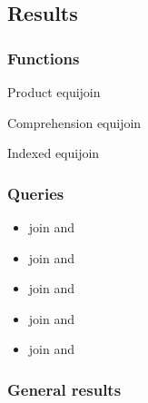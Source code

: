 \documentclass{beamer}
\begin{document}
\subsection{Results}
\begin{frame}
\frametitle{Functions}
\begin{block}{Product equijoin}
    \vspace{-4mm}
    {\scriptsize}
    \vspace{-7mm}
\end{block}\pause
\begin{block}{Comprehension equijoin}
    \vspace{-4mm}
    {\scriptsize}
    \vspace{-7mm}
\end{block}\pause
\begin{block}{Indexed equijoin}
    \vspace{-4mm}
    {\scriptsize}
    \vspace{-7mm}
\end{block}
\end{frame}
\begin{frame}
\frametitle{Queries}
\begin{itemize}
    \item {\large join  and
        }
        \vspace{1.5mm}\pause
    \item {\large join  and
        }
        \vspace{1.5mm}\pause
    \item {\large join  and
        }
        \vspace{1.5mm}\pause
    \item {\large join  and
        }
        \vspace{1.5mm}\pause
    \item {\large join  and
        }
\end{itemize}
\end{frame}

\begin{frame}
\frametitle{General results}

\begin{table}[p]
    \centering
    
    \caption{Percentage change of mean time to complete query `join onePercent
        and onePercent' when using indexed equijoin compared to other
    functions.}
    \label{tab:percentage-change-of-means-join-onePercent-and-onePercent}
\end{table}
\end{frame}
\end{document}
